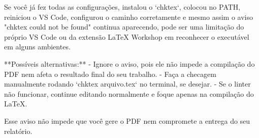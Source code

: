 
Se você já fez todas as configurações, instalou o `chktex`, colocou no PATH, reiniciou o VS Code, configurou o caminho corretamente e mesmo assim o aviso "chktex could not be found" continua aparecendo, pode ser uma limitação do próprio VS Code ou da extensão LaTeX Workshop em reconhecer o executável em alguns ambientes.

**Possíveis alternativas:**
- Ignore o aviso, pois ele não impede a compilação do PDF nem afeta o resultado final do seu trabalho.
- Faça a checagem manualmente rodando `chktex arquivo.tex` no terminal, se desejar.
- Se o linter não funcionar, continue editando normalmente e foque apenas na compilação do LaTeX.

Esse aviso não impede que você gere o PDF nem compromete a entrega do seu relatório.

